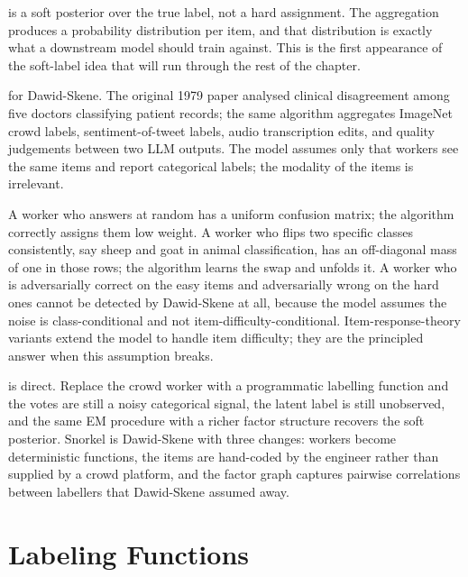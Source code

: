  is a soft posterior over the true label, not a hard assignment. The aggregation produces a probability distribution per item, and that distribution is exactly what a downstream model should train against. This is the first appearance of the soft-label idea that will run through the rest of the chapter.

 for Dawid-Skene. The original 1979 paper analysed clinical disagreement among five doctors classifying patient records; the same algorithm aggregates ImageNet crowd labels, sentiment-of-tweet labels, audio transcription edits, and quality judgements between two LLM outputs. The model assumes only that workers see the same items and report categorical labels; the modality of the items is irrelevant.

 A worker who answers at random has a uniform confusion matrix; the algorithm correctly assigns them low weight. A worker who flips two specific classes consistently, say sheep and goat in animal classification, has an off-diagonal mass of one in those rows; the algorithm learns the swap and unfolds it. A worker who is adversarially correct on the easy items and adversarially wrong on the hard ones cannot be detected by Dawid-Skene at all, because the model assumes the noise is class-conditional and not item-difficulty-conditional. Item-response-theory variants extend the model to handle item difficulty; they are the principled answer when this assumption breaks.

 is direct. Replace the crowd worker with a programmatic labelling function and the votes are still a noisy categorical signal, the latent label is still unobserved, and the same EM procedure with a richer factor structure recovers the soft posterior. Snorkel is Dawid-Skene with three changes: workers become deterministic functions, the items are hand-coded by the engineer rather than supplied by a crowd platform, and the factor graph captures pairwise correlations between labellers that Dawid-Skene assumed away.


\newpage
\section{Labeling Functions}


